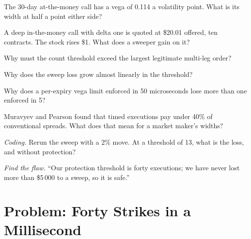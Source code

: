 \begin{exercise}[$\star$]\label{exo:hf:automated-options-market-making:1}
The 30-day at-the-money call has a vega of 0.114 a volatility point. What is its width at half a point either side?
\end{exercise}

\begin{exercise}[$\star$]\label{exo:hf:automated-options-market-making:2}
A deep in-the-money call with delta one is quoted at \$20.01 offered, ten contracts. The stock rises \$1. What does a sweeper gain on it?
\end{exercise}

\begin{exercise}[$\star$]\label{exo:hf:automated-options-market-making:3}
Why must the count threshold exceed the largest legitimate multi-leg order?
\end{exercise}

\begin{exercise}[$\star\star$]\label{exo:hf:automated-options-market-making:4}
Why does the sweep loss grow almost linearly in the threshold?
\end{exercise}

\begin{exercise}[$\star\star$]\label{exo:hf:automated-options-market-making:5}
Why does a per-expiry vega limit enforced in 50 microseconds lose more than one enforced in 5?
\end{exercise}

\begin{exercise}[$\star\star$]\label{exo:hf:automated-options-market-making:6}
Muravyev and Pearson found that timed executions pay under 40\% of conventional spreads. What does that mean for a market maker's widths?
\end{exercise}

\begin{exercise}[$\star\star\star$]\label{exo:hf:automated-options-market-making:7}
\emph{Coding.} Rerun the sweep with a 2\% move. At a threshold of 13, what is the loss, and without protection?
\end{exercise}

\begin{exercise}[$\star\star\star$]\label{exo:hf:automated-options-market-making:8}
\emph{Find the flaw.} ``Our protection threshold is forty executions; we have never lost more than \$5\,000 to a sweep, so it is safe.''
\end{exercise}

\section{Problem: Forty Strikes in a Millisecond}

